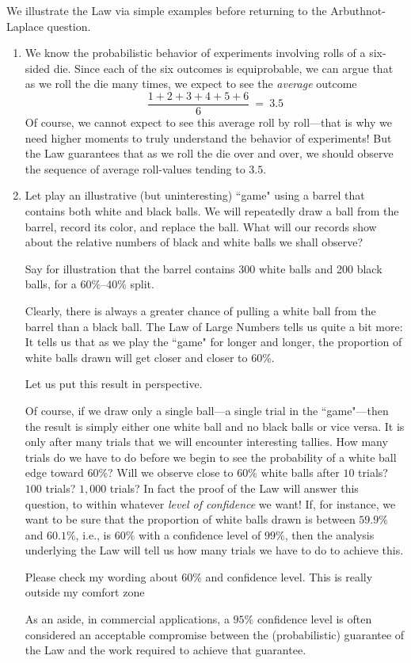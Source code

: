 \medskip

We illustrate the Law via simple examples before returning to the Arbuthnot-Laplace question.

\begin{enumerate}
\item
We know the probabilistic behavior of experiments involving rolls of a six-sided die.  Since each of the six outcomes is equiprobable, we can argue that as we roll the die many times, we expect to see the {\em average} outcome
\[ \frac{1+2+3+4+5+6}{6} \ = \ 3.5 \]
Of course, we cannot expect to see this average roll by roll---that is why we need higher moments to truly understand the behavior of experiments!  But the Law guarantees that as we roll the die over and over, we should observe the sequence of average roll-values tending to $3.5$.

\medskip\item
Let play an illustrative (but uninteresting) ``game" using a barrel that contains both white and black balls.  We will repeatedly draw a ball from the barrel, record its color, and replace the ball.  What will our records show about the relative numbers of black and white balls we shall observe?

\smallskip

Say for illustration that the barrel contains 300 white balls and 200 black balls, for a $60\%$--$40\%$ split.

\smallskip

Clearly, there is always a greater chance of pulling a white ball from the barrel than a black ball.  The Law of Large Numbers tells us quite a bit more:  It tells us that as we play the ``game" for longer and longer, the proportion of white balls drawn will get closer and closer to $60\%$.

\medskip

Let us put this result in perspective.

\smallskip

Of course, if we draw only a single ball---a single trial in the ``game"---then the result is simply either one white ball and no black balls or vice versa.  It is only after many trials that we will encounter interesting tallies. How many trials do we have to do before we begin to see the probability of a white ball edge toward $60\%$?  Will we observe close to $60\%$ white balls after $10$ trials? $100$ trials? $1,000$ trials?  In fact the proof of the Law will answer this question, to within whatever {\it level of confidence} we want!  If, for instance, we want to be sure 
that the proportion of white balls drawn is between $59.9\%$ and $60.1\%$, i.e., is $60\%$ with a confidence level of $99\%$, then the analysis underlying the Law will tell us how many trials we have to do to achieve this.

{\Arny Please check my wording about 60\% and confidence level.  This is really outside my comfort zone}

\smallskip

As an aside, in commercial applications, a $95\%$ confidence level is often considered an acceptable compromise between the (probabilistic) guarantee of the Law and the work required to achieve that guarantee.
\end{enumerate}

